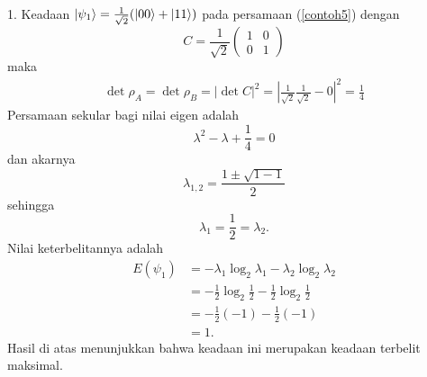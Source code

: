 1. Keadaan $\ket{\psi_1}=\frac{1}{\sqrt{2}}(\ket{00}+\ket{11})$ pada persamaan (\ref{contoh5}) dengan
\begin{equation}
	C=\frac{1}{\sqrt{2}}
	\begin{pmatrix}
		1&0\\
		0&1
	\end{pmatrix}
\end{equation}
maka
\begin{equation}
	\begin{aligned}
		\det \rho_A = \det \rho_B = |\det C|^2=|\frac{1}{\sqrt{2}}\frac{1}{\sqrt{2}}-0|^2=\frac{1}{4}
	\end{aligned}
\end{equation}
Persamaan sekular bagi nilai eigen adalah
\begin{equation}
	\lambda^2-\lambda+\frac{1}{4}=0
\end{equation}
dan akarnya
\begin{equation}
	\lambda_{1,2}=\frac{1\pm\sqrt{1-1}}{2}
\end{equation}
sehingga
\begin{equation}
	\lambda_1=\frac{1}{2}=\lambda_2.
\end{equation}
Nilai keterbelitannya adalah
\begin{equation}
	\begin{aligned}
		E(\psi_1)
		&=-\lambda_1\log_2\lambda_1-\lambda_2\log_2\lambda_2\\
		&=-\frac{1}{2}\log_2\frac{1}{2}-\frac{1}{2}\log_2\frac{1}{2}\\
		&=-\frac{1}{2}(-1)-\frac{1}{2}(-1)\\
		&=1.
	\end{aligned}
\end{equation}
Hasil di atas menunjukkan bahwa keadaan ini merupakan keadaan terbelit maksimal.

